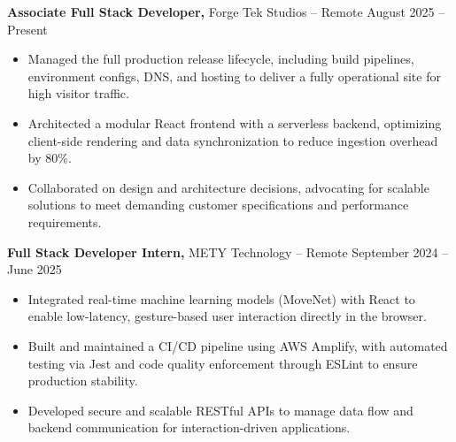 \documentclass[11pt]{article}       %
\begin{document}
\textbf{Associate Full Stack Developer,} {Forge Tek Studios} -- Remote \hfill August 2025 -- Present \\
\vspace{-9pt}
\begin{itemize}
  \item Managed the full production release lifecycle, including build pipelines, environment configs, DNS, and hosting to deliver a fully operational site for high visitor traffic.
  \item Architected a modular React frontend with a serverless backend, optimizing client-side rendering and data synchronization to reduce ingestion overhead by 80\%.
  \item Collaborated on design and architecture decisions, advocating for scalable solutions to meet demanding customer specifications and performance requirements.
\end{itemize}

\textbf{Full Stack Developer Intern,} {METY Technology} -- Remote \hfill September 2024 -- June 2025 \\
\vspace{-9pt}
\begin{itemize}
  \item Integrated real-time machine learning models (MoveNet) with React to enable low-latency, gesture-based user interaction directly in the browser.
  \item Built and maintained a CI/CD pipeline using AWS Amplify, with automated testing via Jest and code quality enforcement through ESLint to ensure production stability.
  \item Developed secure and scalable RESTful APIs to manage data flow and backend communication for interaction-driven applications.
\end{itemize}

\end{document}
